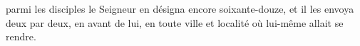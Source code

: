 \encetemps parmi les disciples le Seigneur en désigna encore soixante-douze,
	et il les envoya deux par deux, en avant de lui,
	en toute ville et localité où lui-même allait se rendre.
